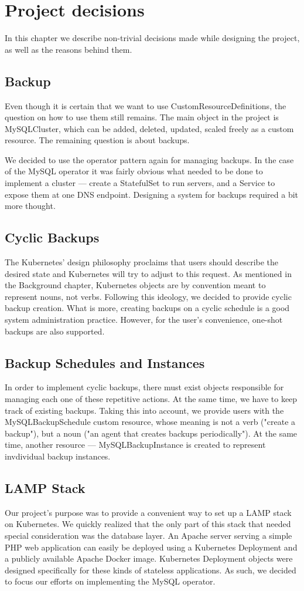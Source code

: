 \chapter{Project decisions}
In this chapter we describe non-trivial decisions made while designing the project, as well as the
reasons behind them.

\section{Backup}
Even though it is certain that we want to use CustomResourceDefinitions, the question on how to
use them still remains. The main object in the project is MySQLCluster, which can be added,
deleted, updated, scaled freely as a custom resource. The remaining question is about backups.

We decided to use the operator pattern again for managing backups. In the case of the MySQL
operator it was fairly obvious what needed to be done to implement a cluster --- create a
StatefulSet to run servers, and a Service to expose them at one DNS endpoint. Designing a system
for backups required a bit more thought.

\section{Cyclic Backups}
The Kubernetes’ design philosophy proclaims that users should describe the desired state and
Kubernetes will try to adjust to this request. As mentioned in the Background chapter, Kubernetes
objects are by convention meant to represent nouns, not verbs. Following this ideology, we
decided to provide cyclic backup creation. What is more, creating backups on a cyclic schedule
is a good system administration practice. However, for the user’s convenience, one-shot backups are
also supported.

\section{Backup Schedules and Instances}
In order to implement cyclic backups, there must exist objects responsible for managing each one of
these repetitive actions. At the same time, we have to keep track of existing backups. Taking this
into account, we provide users with the MySQLBackupSchedule custom resource, whose meaning is not a
verb ("create a backup"), but a noun ("an agent that creates backups periodically"). At the same
time, another resource --- MySQLBackupInstance is created to represent invdividual backup instances.

\section{LAMP Stack}
Our project’s purpose was to provide a convenient way to set up a LAMP
stack on Kubernetes. We quickly realized that the only part of this stack that needed special
consideration was the database layer. An Apache server serving a simple PHP web application can
easily be deployed using a Kubernetes Deployment and a publicly available Apache Docker image.
Kubernetes Deployment objects were designed specifically for these kinds of stateless applications.
As such, we decided to focus our efforts on implementing the MySQL operator.
